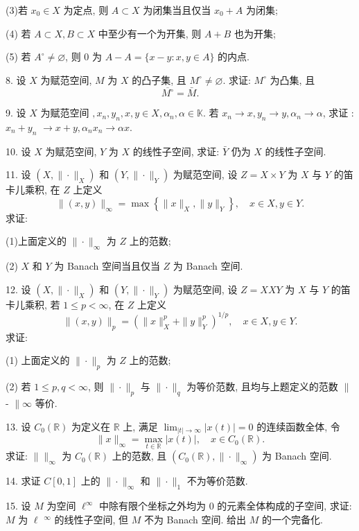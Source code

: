 \documentclass[openany]{ctexbook}
\theoremstyle{kaiti}
\theoremstyle{normal}
\begin{document}
(3)若 $x_0 \in X$ 为定点, 则 $A \subset X$ 为闭集当且仅当 $x_0+A$ 为闭集;

(4) 若 $A \subset X, B \subset X$ 中至少有一个为开集, 则 $A+B$ 也为开集;

(5) 若 $A^{\circ} \neq \varnothing$, 则 0 为 $A-A=\{x-y: x, y \in A\}$ 的内点.

8. 设 $X$ 为赋范空间, $M$ 为 $X$ 的凸子集, 且 $M^{\circ} \neq \varnothing$. 求证: $M^{\circ}$ 为凸集, 且
$$
\overline{M^{\circ}}=\bar{M}.
$$

9. 设 $X$ 为赋范空间 $, x_n, y_n, x, y \in X, \alpha_n, \alpha \in \mathbb{K}$. 若 $x_n \rightarrow x, y_n \rightarrow y, \alpha_n \rightarrow \alpha$, 求证 : $x_n+y_n$ $\rightarrow x+y, \alpha_n x_n \rightarrow \alpha x$.

10. 设 $X$ 为赋范空间, $Y$ 为 $X$ 的线性子空间, 求证: $\bar{Y}$ 仍为 $X$ 的线性子空间.

11. 设 $\left(X,\|\cdot\|_{X}\right)$ 和 $\left(Y,\|\cdot\|_{Y}\right)$ 为赋范空间, 设 $Z=X \times Y$ 为 $X$ 与 $Y$ 的笛卡儿乘积, 在 $Z$ 上定义
$$
\|(x, y)\|_{\infty}=\max\left\{\|x\|_{X},\|y\|_{Y}\right\}, \quad x \in X, y \in Y.
$$
求证:

(1)上面定义的 $\|\cdot\|_{\infty}$ 为 $Z$ 上的范数;

(2) $X$ 和 $Y$ 为 Banach 空间当且仅当 $Z$ 为 Banach 空间.

12. 设 $\left(X,\|\cdot\|_{X}\right)$ 和 $\left(Y,\|\cdot\|_{Y}\right)$ 为赋范空间, 设 $Z=X X Y$ 为 $X$ 与 $Y$ 的笛卡儿乘积, 若 $1 \leqslant p<\infty$, 在 $Z$ 上定义
$$
\|(x, y)\|_{p}=\left(\|x\|_{X}^{p}+\|y\|_{Y}^{p}\right)^{1 / p}, \quad x \in X, y \in Y.
$$
求证:

(1) 上面定义的 $\|\cdot\|_{p}$ 为 $Z$ 上的范数;

(2) 若 $1 \leqslant p, q<\infty$, 则 $\|\cdot\|_{p}$ 与 $\|\cdot\|_{q}$ 为等价范数, 且均与上题定义的范数 $\|$ - $\| \infty$ 等价.

13. 设 $C_0(\mathbb{R})$ 为定义在 $\mathbb{R}$ 上, 满足 $\lim_{|t| \rightarrow \infty}|x(t)|=0$ 的连续函数全体, 令
$$
\|x\|_{\infty}=\max_{t \in \mathbb{R}}|x(t)|, \quad x \in C_0(\mathbb{R}).
$$
求证: $\| \|_{\infty}$ 为 $C_0(\mathbb{R})$ 上的范数, 且 $\left(C_0(\mathbb{R}),\|\cdot\|_{\infty}\right)$ 为 Banach 空间.

14. 求证 $C[0,1]$ 上的 $\|\cdot\|_{\infty}$ 和 $\|\cdot\|_1$ 不为等价范数.

15. 设 $M$ 为空间 $\ell^{\infty}$ 中除有限个坐标之外均为 0 的元素全体构成的子空间, 求证: $M$ 为 $\ell$ ${ }^{\infty}$ 的线性子空间, 但 $M$ 不为 Banach 空间. 给出 $M$ 的一个完备化.
\end{document}
